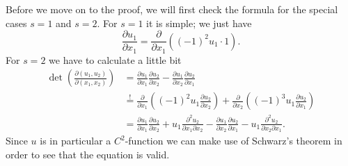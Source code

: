 \begin{example}
Before we move on to the proof, we will first check the formula for the special cases $s=1$ and $s=2$. For $s=1$ it is simple; we just have
\[\frac{\partial u_1}{\partial x_1}=\frac{\partial}{\partial x_1}((-1)^2u_1\cdot1).\]
For $s=2$ we have to calculate a little bit
\begin{align*}
	\det\left(\frac{\partial(u_1,u_2)}{\partial(x_1,x_2)}\right)&=\frac{\partial u_1}{\partial x_1}\frac{\partial u_2}{\partial x_2}-\frac{\partial u_1}{\partial x_2}\frac{\partial u_2}{\partial x_1}\\
	&\overset{!}{=}\frac{\partial}{\partial x_1}\left((-1)^2u_1\frac{\partial u_2}{\partial x_2}\right)+\frac{\partial}{\partial x_2}\left((-1)^3u_1\frac{\partial u_2}{\partial x_1}\right)\\
	&=\frac{\partial u_1}{\partial x_1}\frac{\partial u_2}{\partial x_2}+u_1\frac{\partial^2u_2}{\partial x_1\partial x_2}-\frac{\partial u_1}{\partial x_2}\frac{\partial u_2}{\partial x_1}-u_1\frac{\partial^2u_2}{\partial x_2\partial x_1}.
\end{align*}
Since $u$ is in particular a $C^2$-function we can make use of Schwarz's theorem in order to see that the equation is valid.
\end{example}

